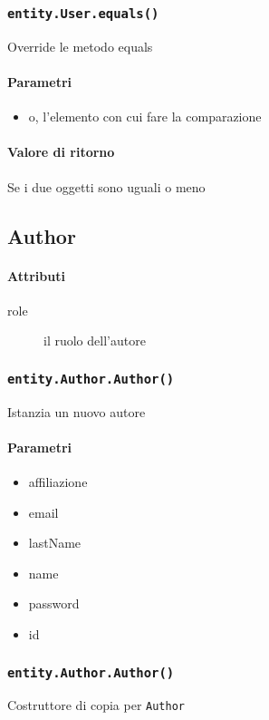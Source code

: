 \subsubsection{\texttt{entity.User.equals()}}
Override le metodo equals
\paragraph{Parametri}
\begin{itemize}
\item o, l'elemento con cui fare la comparazione
\end{itemize}
\paragraph{Valore di ritorno}
Se i due oggetti sono uguali o meno


\subsection{Author}
\paragraph{Attributi}
\begin{description}
\item [role] il ruolo dell'autore
\end{description}

\subsubsection{\texttt{entity.Author.Author()}}
Istanzia un nuovo autore
\paragraph{Parametri}
\begin{itemize}
\item affiliazione
\item email
\item lastName
\item name
\item password
\item id
\end{itemize}

\subsubsection{\texttt{entity.Author.Author()}}
Costruttore di copia per \texttt{Author}
